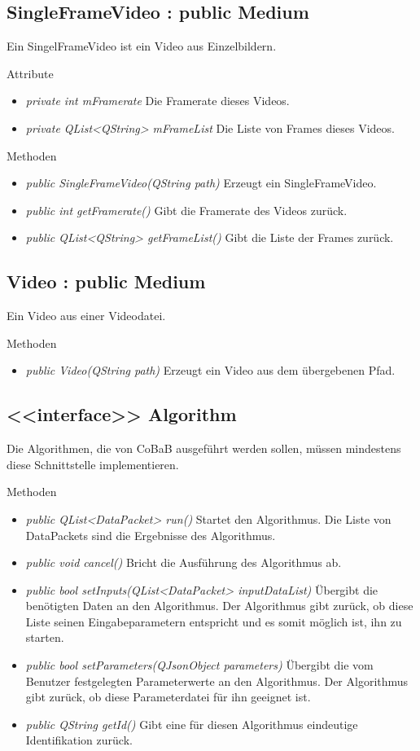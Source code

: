 \subsection*{SingleFrameVideo : public Medium}
Ein SingelFrameVideo ist ein Video aus Einzelbildern.

Attribute
\begin{itemize}
\item\textit{private int mFramerate} Die Framerate dieses Videos.
\item\textit{private QList<QString> mFrameList} Die Liste von Frames dieses Videos.
\end{itemize}

Methoden
\begin{itemize}
\item \textit{public SingleFrameVideo(QString path)} Erzeugt ein SingleFrameVideo.
\item \textit{public int getFramerate()} Gibt die Framerate des Videos zurück.
\item \textit{public QList<QString> getFrameList()} Gibt die Liste der Frames zurück.
\end{itemize}

\subsection*{Video : public Medium}
Ein Video aus einer Videodatei.

Methoden
\begin{itemize}
\item \textit{public Video(QString path)} Erzeugt ein Video aus dem übergebenen Pfad.
\end{itemize}

\subsection*{<<interface>> Algorithm}
Die Algorithmen, die von CoBaB ausgeführt werden sollen, müssen mindestens diese Schnittstelle implementieren.

Methoden
\begin{itemize}
\item\textit{public QList<DataPacket> run()} Startet den Algorithmus. Die Liste von DataPackets sind die Ergebnisse des Algorithmus.
\item\textit{public void cancel()} Bricht die Ausführung des Algorithmus ab.
\item\textit{public bool setInputs(QList<DataPacket> inputDataList)} Übergibt die benötigten Daten an den Algorithmus. Der Algorithmus gibt zurück, ob diese Liste seinen Eingabeparametern entspricht und es somit möglich ist, ihn zu starten.
\item\textit{public bool setParameters(QJsonObject parameters)} Übergibt die vom Benutzer festgelegten Parameterwerte an den Algorithmus. Der Algorithmus gibt zurück, ob diese Parameterdatei für ihn geeignet ist.
\item\textit{public QString getId()} Gibt eine für diesen Algorithmus eindeutige Identifikation zurück.
\end{itemize}

